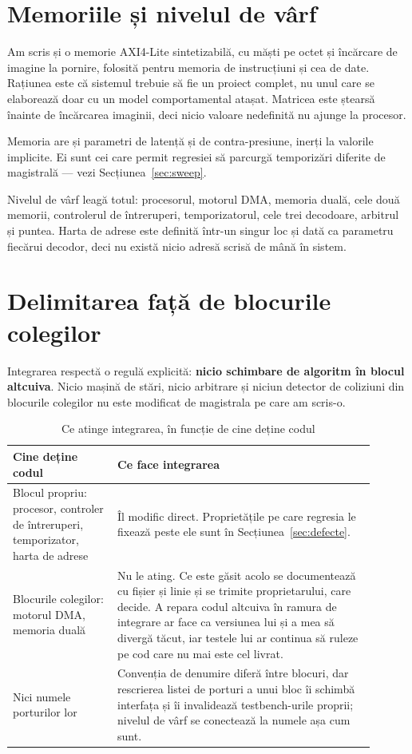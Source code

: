 \documentclass[11pt,openany]{report}
\begin{document}
\section{Memoriile și nivelul de vârf}

Am scris și o memorie AXI4-Lite sintetizabilă, cu măști pe octet și încărcare de
imagine la pornire, folosită pentru memoria de instrucțiuni și cea de date.
Rațiunea este că sistemul trebuie să fie un proiect complet, nu unul care se
elaborează doar cu un model comportamental atașat. Matricea este ștearsă înainte
de încărcarea imaginii, deci nicio valoare nedefinită nu ajunge la procesor.

Memoria are și parametri de latență și de contra-presiune, inerți la valorile
implicite. Ei sunt cei care permit regresiei să parcurgă temporizări diferite de
magistrală --- vezi Secțiunea~\ref{sec:sweep}.

Nivelul de vârf leagă totul: procesorul, motorul DMA, memoria duală, cele două
memorii, controlerul de întreruperi, temporizatorul, cele trei decodoare,
arbitrul și puntea. Harta de adrese este definită într-un singur loc și dată ca
parametru fiecărui decodor, deci nu există nicio adresă scrisă de mână în
sistem.

\section{Delimitarea față de blocurile colegilor}

Integrarea respectă o regulă explicită: \textbf{nicio schimbare de algoritm în
blocul altcuiva}. Nicio mașină de stări, nicio arbitrare și niciun detector de
coliziuni din blocurile colegilor nu este modificat de magistrala pe care am
scris-o.

\begin{table}[H]
\centering
\caption{Ce atinge integrarea, în funcție de cine deține codul}
\label{tab:integr-schimbari}
\small
\begin{tabular}{@{}L{0.26\linewidth}L{0.64\linewidth}@{}}
\toprule
\textbf{Cine deține codul} & \textbf{Ce face integrarea} \\
\midrule
Blocul propriu: procesor, controler de întreruperi, temporizator, harta de
adrese &
  Îl modific direct. Proprietățile pe care regresia le fixează
  peste ele sunt în Secțiunea~\ref{sec:defecte}. \\
\addlinespace
Blocurile colegilor: motorul DMA, memoria duală &
  Nu le ating. Ce este găsit acolo se documentează cu fișier și linie și se trimite
  proprietarului, care decide. A repara codul altcuiva în ramura de integrare ar
  face ca versiunea lui și a mea să divergă tăcut, iar testele lui ar continua să
  ruleze pe cod care nu mai este cel livrat. \\
\addlinespace
Nici numele porturilor lor &
  Convenția de denumire diferă între blocuri, dar rescrierea listei de porturi a
  unui bloc îi schimbă interfața și îi invalidează testbench-urile
  proprii; nivelul de vârf se conectează la numele așa cum sunt. \\
\bottomrule
\end{tabular}
\end{table}
\end{document}

